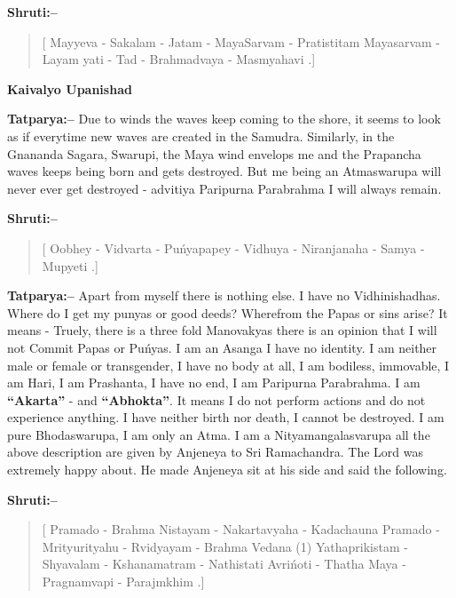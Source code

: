\textbf{Shruti:–}

\begin{verse}
[ Mayyeva - Sakalam - Jatam - MayaSarvam - Prati\break stitam  Mayasarvam - Layam yati - Tad - Brahmadvaya - Masmyahavi .]
\end{verse}

\begin{flushright}
\textbf{Kaivalyo Upanishad}
\end{flushright}

\textbf{Tatparya:–} Due to winds the waves keep coming to the shore, it seems to look as if everytime new waves are created in the Samudra. Similarly, in the Gnananda Sagara, Swarupi, the Maya wind envelops me and the Prapancha waves keeps being born and gets destroyed. But me being an Atmaswarupa will never ever get destroyed - advitiya Paripurna Parabrahma I will always remain.

\textbf{Shruti:–}

\begin{verse}
[ Oobhey - Vidvarta - Puńyapapey - Vidhuya - Niranjanaha - Samya - Mupyeti .]
\end{verse}

\textbf{Tatparya:–} Apart from myself there is nothing else. I have no Vidhinishadhas. Where do I get my punyas or good deeds? Wherefrom the Papas or sins arise? It means - Truely, there is a three fold Manovakyas there is an opinion that I will not Commit Papas or Puńyas. I am an Asanga I have no identity. I am neither male or female or transgender, I have no body at all, I am bodiless, immovable, I am Hari, I am Prashanta, I have no end, I am Paripurna Parabrahma. I am \textbf{“Akarta”} - and \textbf{“Abhokta”}. It means I do not perform actions and do not experience anything. I have neither birth nor death, I cannot be destroyed. I am pure Bhodaswarupa, I am only an Atma. I am a Nityamangalasvarupa all the above description are given by Anjeneya to Sri Ramachandra. The Lord was extremely happy about. He made Anjeneya sit at his side and said the following.

\textbf{Shruti:–}

\begin{verse}
[ Pramado - Brahma Nistayam - Nakartavyaha - Kada\break chauna  Pramado - Mrityurityahu - Rvidyayam - Brahma Vedana (1) Yathaprikistam - Shyavalam - Kshanamatram - Nathistati  Avrińoti - Thatha Maya - Pragnamvapi - Parajmkhim .]
\end{verse}

